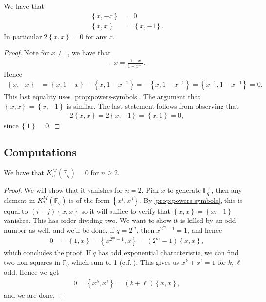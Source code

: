 \documentclass[11pt,openany]{book}
\begin{document}
\begin{proposition}\label{prop:KM2-relations} 
\cite[1.1,~1.2]{MilnorK}
We have that
\begin{align*}
    \left\{ x,-x \right\} &= 0 \\
    \left\{ x,x \right\} &= \left\{ x,-1 \right\}.
\end{align*}
In particular $2\left\{ x,x \right\} = 0$ for any $x$.
\end{proposition}
\begin{proof} Note for $x\ne 1$, we have that
\begin{align*}
    -x = \frac{1-x}{ 1- x^{-1}}.
\end{align*}
%
Hence 
\begin{align*}
    \left\{ x,-x \right\} &= \left\{ x,1-x \right\} - \left\{ x, 1-x^{-1} \right\} = -\left\{ x, 1- x^{-1} \right\} = \left\{x^{-1}, 1-x^{-1} \right\} = 0.
\end{align*}
This last equality uses \autoref{prop:powers-symbols}.
The argument that $\left\{ x,x \right\} = \left\{ x,-1 \right\}$ is similar.
The last statement follows from observing that
\begin{align*}
    2\left\{ x,x \right\} = 2 \left\{ x, -1 \right\} = \left\{ x, 1 \right\} = 0,
\end{align*}
since $\left\{ 1 \right\} = 0$.
\end{proof}



\subsection{Computations}

%
\begin{example} \cite[III.6.1,~III.7.2]{Kbook}
We have that $K_n^M(\mathbb{F}_q) =0$ for $n\ge 2$.
\end{example}
\begin{proof} We will show that it vanishes for $n=2$. Pick $x$ to generate $\mathbb{F}_q^\times$, then any element in $K_2^M(\mathbb{F}_q)$ is of the form $\left\{ x^i,x^j \right\}$. By \autoref{prop:powers-symbols}, this is equal to $(i+j) \left\{ x,x \right\}$ so it will suffice to verify that $\left\{ x,x \right\} = \left\{ x,-1 \right\}$ vanishes. This has order dividing two. We want to show it is killed by an odd number as well, and we'll be done. If $q = 2^m$, then $x^{2^m-1}=1$, and hence
\begin{align*}
    0 &= \left\{ 1,x \right\} = \left\{ x^{2^m-1},x \right\} = \left( 2^m-1 \right)\left\{ x,x \right\},
\end{align*}
which concludes the proof. If $q$ has odd exponential characteristic, we can find two non-squares in $\mathbb{F}_q$ which sum to 1 (c.f. \cite[1.3.6]{GS}). This gives us $x^k + x^\ell = 1$ for $k,\ell$ odd. Hence we get
\begin{align*}
    0 = \left\{ x^k,x^\ell \right\} = (k+ \ell) \left\{ x,x \right\},
\end{align*}
and we are done.
\end{proof}
\end{document}
